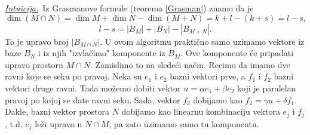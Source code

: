 \documentclass[a4paper,12pt,twoside]{report}
\numberwithin{algorithm}{section}
\newcommand{\intuicija}{\noindent\underline{\textit{Intuicija:}}\ }
\begin{document}
\intuicija Iz Grasmanove formule (teorema \ref{Grasman}) znamo da je
\[ \dim (M \cap N) = \dim M + \dim N - \dim (M + N) = k + l - (k + s) = l-s, \]
\[ l - s = |B_M| + |B_N| - |B_{M+N}|. \]
To je upravo broj $|B_{M \cap N}|$. U ovom algoritmu praktično samo uzimamo vektore iz baze $B_N$ i iz njih "izvlačimo" komponente 
iz $B_M$. Ove komponente će pripadati upravo prostoru $M \cap N$. Zamislimo to na sledeći način. Recimo da imamo dve ravni koje se 
seku po pravoj. Neka su $e_1$ i $e_2$ bazni vektori prve, a $f_1$ i $f_2$ bazni vektori druge ravni. Tada možemo dobiti vektor 
$u = \alpha e_1 + \beta e_2$ koji je paralelan pravoj po kojoj se date ravni seku. Sada, vektor $f_2$ dobijamo kao $f_2 = \gamma u + \delta f_1$.
Dakle, bazni vektor prostora $N$ dobijamo kao linearnu kombinaciju vektora $e_j$ i $f_j$, t.d. $e_j$ leži upravo u $N \cap M$, pa
zato uzimamo samo tu komponentu.

\newpage
\end{document}
